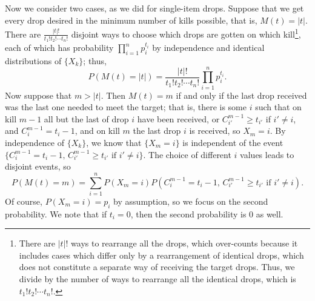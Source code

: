 \documentclass[letterpaper]{article}
\begin{document}
	Now we consider two cases, as we did for single-item drops. Suppose that we get every drop desired in the minimum number of kills possible, that is, $M(t) = |t|$. There are $\frac{|t|!}{t_1!t_2!\cdots t_n!}$ disjoint ways to choose which drops are gotten on which kill\footnote{There are $|t|!$ ways to rearrange all the drops, which over-counts because it includes cases which differ only by a rearrangement of identical drops, which does not constitute a separate way of receiving the target drops. Thus, we divide by the number of ways to rearrange all the identical drops, which is $t_1!t_2!\cdots t_n!$.}, each of which has probability $\prod\limits_{i=1}^n p_i^{t_i}$ by independence and identical distributions of $\{X_k\}$; thus,
	\begin{equation}
		\label{eq:prob_perfect}
		P(M(t) = |t|) = \frac{|t|!}{t_1!t_2!\cdots t_n!}\prod\limits_{i=1}^n p_i^{t_i}.
	\end{equation}
	Now suppose that $m > |t|$. Then $M(t) = m$ if and only if the last drop received was the last one needed to meet the target; that is, there is some $i$ such that on kill $m-1$ all but the last of drop $i$ have been received, or $C_{i'}^{m-1} \ge t_{i'}$ if $i' \ne i$, and ${C_{i}^{m-1} = t_i - 1}$, and on kill $m$ the last drop $i$ is received, so $X_m = i$. By independence of $\{X_k\}$, we know that $\{X_m{=}i\}$ is independent of the event $\{C_i^{m-1}{=}t_i-1,\,C_{i'}^{m-1}{\ge} t_{i'} \text{ if } i' \ne i\}$. The choice of different $i$ values leads to disjoint events, so
	\begin{equation*}
		P(M(t){=}m) = \sum_{i=1}^n P(X_m{=}i)P(C_i^{m-1}{=}t_i-1,\,C_{i'}^{m-1}{\ge}t_{i'} \text{ if } i'\ne i).
	\end{equation*}
	Of course, $P(X_m{=}i) = p_i$ by assumption, so we focus on the second probability. We note that if $t_i = 0$, then the second probability is 0 as well. 
	
\end{document}

